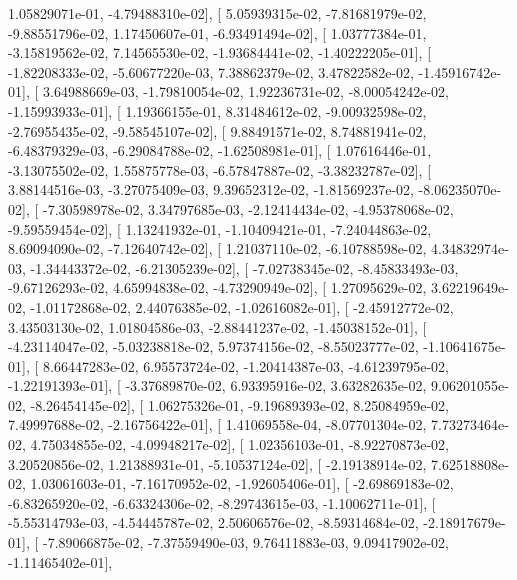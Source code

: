 \documentclass{article}
\begin{document}
          1.05829071e-01,  -4.79488310e-02],
       [  5.05939315e-02,  -7.81681979e-02,  -9.88551796e-02,
          1.17450607e-01,  -6.93491494e-02],
       [  1.03777384e-01,  -3.15819562e-02,   7.14565530e-02,
         -1.93684441e-02,  -1.40222205e-01],
       [ -1.82208333e-02,  -5.60677220e-03,   7.38862379e-02,
          3.47822582e-02,  -1.45916742e-01],
       [  3.64988669e-03,  -1.79810054e-02,   1.92236731e-02,
         -8.00054242e-02,  -1.15993933e-01],
       [  1.19366155e-01,   8.31484612e-02,  -9.00932598e-02,
         -2.76955435e-02,  -9.58545107e-02],
       [  9.88491571e-02,   8.74881941e-02,  -6.48379329e-03,
         -6.29084788e-02,  -1.62508981e-01],
       [  1.07616446e-01,  -3.13075502e-02,   1.55875778e-03,
         -6.57847887e-02,  -3.38232787e-02],
       [  3.88144516e-03,  -3.27075409e-03,   9.39652312e-02,
         -1.81569237e-02,  -8.06235070e-02],
       [ -7.30598978e-02,   3.34797685e-03,  -2.12414434e-02,
         -4.95378068e-02,  -9.59559454e-02],
       [  1.13241932e-01,  -1.10409421e-01,  -7.24044863e-02,
          8.69094090e-02,  -7.12640742e-02],
       [  1.21037110e-02,  -6.10788598e-02,   4.34832974e-03,
         -1.34443372e-02,  -6.21305239e-02],
       [ -7.02738345e-02,  -8.45833493e-03,  -9.67126293e-02,
          4.65994838e-02,  -4.73290949e-02],
       [  1.27095629e-02,   3.62219649e-02,  -1.01172868e-02,
          2.44076385e-02,  -1.02616082e-01],
       [ -2.45912772e-02,   3.43503130e-02,   1.01804586e-03,
         -2.88441237e-02,  -1.45038152e-01],
       [ -4.23114047e-02,  -5.03238818e-02,   5.97374156e-02,
         -8.55023777e-02,  -1.10641675e-01],
       [  8.66447283e-02,   6.95573724e-02,  -1.20414387e-03,
         -4.61239795e-02,  -1.22191393e-01],
       [ -3.37689870e-02,   6.93395916e-02,   3.63282635e-02,
          9.06201055e-02,  -8.26454145e-02],
       [  1.06275326e-01,  -9.19689393e-02,   8.25084959e-02,
          7.49997688e-02,  -2.16756422e-01],
       [  1.41069558e-04,  -8.07701304e-02,   7.73273464e-02,
          4.75034855e-02,  -4.09948217e-02],
       [  1.02356103e-01,  -8.92270873e-02,   3.20520856e-02,
          1.21388931e-01,  -5.10537124e-02],
       [ -2.19138914e-02,   7.62518808e-02,   1.03061603e-01,
         -7.16170952e-02,  -1.92605406e-01],
       [ -2.69869183e-02,  -6.83265920e-02,  -6.63324306e-02,
         -8.29743615e-03,  -1.10062711e-01],
       [ -5.55314793e-03,  -4.54445787e-02,   2.50606576e-02,
         -8.59314684e-02,  -2.18917679e-01],
       [ -7.89066875e-02,  -7.37559490e-03,   9.76411883e-03,
          9.09417902e-02,  -1.11465402e-01],
\end{document}
